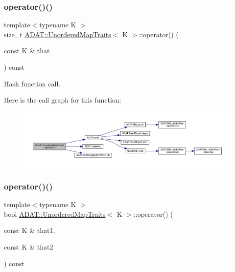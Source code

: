 \subsubsection{\texorpdfstring{operator()()}{operator()()}\hspace{0.1cm}{\footnotesize\ttfamily [2/4]}}
{\footnotesize\ttfamily template$<$typename K $>$ \\
size\+\_\+t \mbox{\hyperlink{structADAT_1_1UnorderedMapTraits}{A\+D\+A\+T\+::\+Unordered\+Map\+Traits}}$<$ K $>$\+::operator() (\begin{DoxyParamCaption}\item[{const K \&}]{that }\end{DoxyParamCaption}) const\hspace{0.3cm}{\ttfamily [inline]}}



Hash function call. 

Here is the call graph for this function\+:
\nopagebreak
\begin{figure}[H]
\begin{center}
\leavevmode
\includegraphics[width=350pt]{dd/d81/structADAT_1_1UnorderedMapTraits_ab9d8c80fb0f561fdadad5be6263d3f94_cgraph}
\end{center}
\end{figure}
\mbox{\label{structADAT_1_1UnorderedMapTraits_a14c1daf5e4530fc4c749ec681103e7a2}} 
\subsubsection{\texorpdfstring{operator()()}{operator()()}\hspace{0.1cm}{\footnotesize\ttfamily [3/4]}}
{\footnotesize\ttfamily template$<$typename K $>$ \\
bool \mbox{\hyperlink{structADAT_1_1UnorderedMapTraits}{A\+D\+A\+T\+::\+Unordered\+Map\+Traits}}$<$ K $>$\+::operator() (\begin{DoxyParamCaption}\item[{const K \&}]{that1,  }\item[{const K \&}]{that2 }\end{DoxyParamCaption}) const\hspace{0.3cm}{\ttfamily [inline]}}



